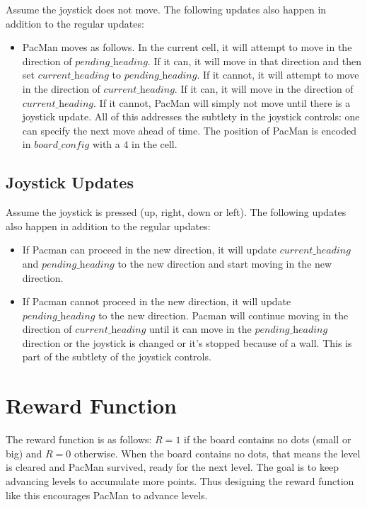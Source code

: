 \documentclass[paper=a4, fontsize=11pt]{scrartcl}
\begin{document}
Assume the joystick does not move. The following updates also happen in addition to the regular updates:

\begin{itemize}
\item PacMan moves as follows. In the current cell, it will attempt to move in the direction of $\textit{pending\_heading}$. If it can, it will move in that direction and then set $\textit{current\_heading}$ to $\textit{pending\_heading}$. If it cannot, it will attempt to move in the direction of $\textit{current\_heading}$. If it can, it will move in the direction of $\textit{current\_heading}$. If it cannot, PacMan will simply not move until there is a joystick update. All of this addresses the subtlety in the joystick controls: one can specify the next move ahead of time. The position of PacMan is encoded in $\textit{board\_config}$ with a $4$ in the cell.
\end{itemize}

\subsection{Joystick Updates}

Assume the joystick is pressed (up, right, down or left). The following updates also happen in addition to the regular updates:

\begin{itemize}
\item If Pacman can proceed in the new direction, it will update $\textit{current\_heading}$ and $\textit{pending\_heading}$ to the new direction and start moving in the new direction.

\item If Pacman cannot proceed in the new direction, it will update $\textit{pending\_heading}$ to the new direction. Pacman will continue moving in the direction of $\textit{current\_heading}$ until it can move in the $\textit{pending\_heading}$ direction or the joystick is changed or it's stopped because of a wall. This is part of the subtlety of the joystick controls.
\end{itemize}

\section{Reward Function}

The reward function is as follows: $R=1$ if the board contains no dots (small or big) and $R=0$ otherwise. When the board contains no dots, that means the level is cleared and PacMan survived, ready for the next level. The goal is to keep advancing levels to accumulate more points. Thus designing the reward function like this encourages PacMan to advance levels.
\end{document}
